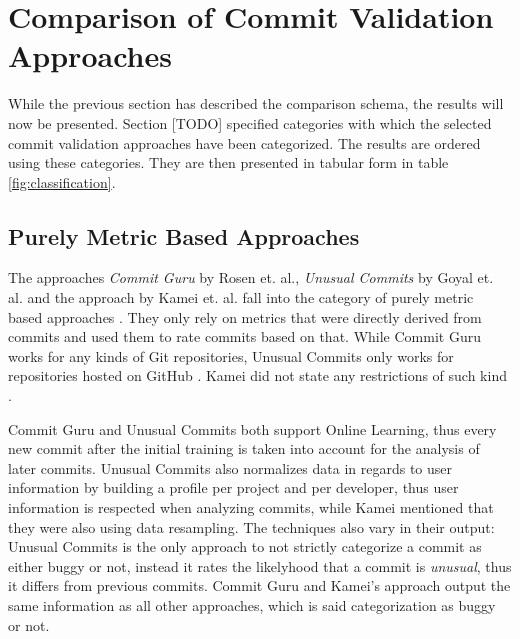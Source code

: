 \section{Comparison of Commit Validation Approaches}
\label{sec:comparison}

While the previous section has described the comparison schema, the results will now be presented. Section [TODO] specified categories with which the selected commit validation approaches have been categorized. The results are ordered using these categories. They are then presented in tabular form in table \ref{fig:classification}.

\subsection{Purely Metric Based Approaches}

The approaches \textit{Commit Guru} by Rosen et. al., \textit{Unusual Commits} by Goyal et. al. and the approach by Kamei et. al. fall into the category of purely metric based approaches \cite{Rosen2015,Goyal2017,Kamei2013}. They only rely on metrics that were directly derived from commits and used them to rate commits based on that. While Commit Guru works for any kinds of Git repositories, Unusual Commits only works for repositories hosted on GitHub \cite{Rosen2015,Goyal2017}. Kamei did not state any restrictions of such kind \cite{Kamei2013}.

Commit Guru and Unusual Commits both support Online Learning, thus every new commit after the initial training is taken into account for the analysis of later commits.
Unusual Commits also normalizes data in regards to user information by building a profile per project and per developer, thus user information is respected when analyzing commits, 
while Kamei mentioned that they were also using data resampling.
The techniques also vary in their output: Unusual Commits is the only approach to not strictly categorize a commit as either buggy or not, instead it rates the likelyhood that a commit is \textit{unusual}, thus it differs from previous commits. Commit Guru and Kamei's approach output the same information as all other approaches, which is said categorization as buggy or not. \cite{Rosen2015,Goyal2017,Kamei2013}

